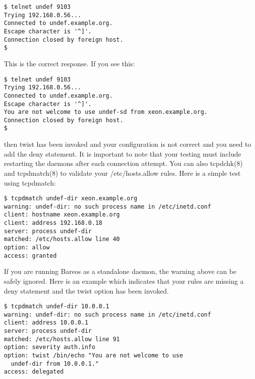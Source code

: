 {\footnotesize
\begin{verbatim}
$ telnet undef 9103
Trying 192.168.0.56...
Connected to undef.example.org.
Escape character is '^]'.
Connection closed by foreign host.
$
\end{verbatim}
\normalsize

This is the correct response. If you see this:

\footnotesize
\begin{verbatim}
$ telnet undef 9103
Trying 192.168.0.56...
Connected to undef.example.org.
Escape character is '^]'.
You are not welcome to use undef-sd from xeon.example.org.
Connection closed by foreign host.
$
\end{verbatim}
\normalsize

then twist has been invoked and your configuration is not correct and you need
to add the deny statement. It is important to note that your testing must
include restarting the daemons after each connection attempt. You can also
tcpdchk(8) and tcpdmatch(8) to validate your /etc/hosts.allow rules. Here is a
simple test using tcpdmatch:

\footnotesize
\begin{verbatim}
$ tcpdmatch undef-dir xeon.example.org
warning: undef-dir: no such process name in /etc/inetd.conf
client: hostname xeon.example.org
client: address 192.168.0.18
server: process undef-dir
matched: /etc/hosts.allow line 40
option: allow
access: granted
\end{verbatim}
\normalsize

If you are running Bareos as a standalone daemon, the warning above can be
safely ignored. Here is an example which indicates that your rules are missing
a deny statement and the twist option has been invoked.

\footnotesize
\begin{verbatim}
$ tcpdmatch undef-dir 10.0.0.1
warning: undef-dir: no such process name in /etc/inetd.conf
client: address 10.0.0.1
server: process undef-dir
matched: /etc/hosts.allow line 91
option: severity auth.info
option: twist /bin/echo "You are not welcome to use
  undef-dir from 10.0.0.1."
access: delegated
\end{verbatim}
\normalsize
}

